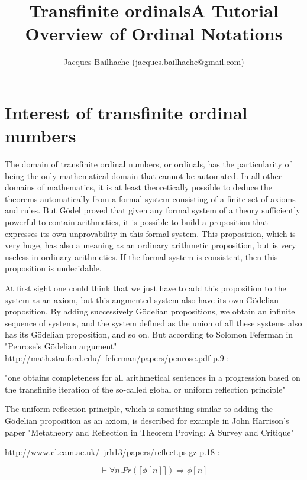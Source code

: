 \documentclass[10pt]{article}
\title{Transfinite ordinals}
\begin{document}
\title{A Tutorial Overview of Ordinal Notations}
\author{Jacques Bailhache (jacques.bailhache@gmail.com)}

\maketitle

\setlength{\parindent}{0pt}

\section{Interest of transfinite ordinal numbers}

The domain of transfinite ordinal numbers, or ordinals, has the particularity of being the only mathematical domain that cannot be automated. In all other domains of mathematics, it is at least theoretically possible to deduce the theorems automatically from a formal system consisting of a finite set of axioms and rules. But Gödel proved that given any formal system of a theory sufficiently powerful to contain arithmetics, it is possible to build a proposition that expresses its own unprovability in this formal system. This proposition, which is very huge, has also a meaning as an ordinary arithmetic proposition, but is very useless in ordinary arithmetics. If the formal system is consistent, then this proposition is undecidable. 

At first sight one could think that we just have to add this proposition to the system as an axiom, but this augmented system also have its own Gödelian proposition. By adding successively Gödelian propositions, we obtain an infinite sequence of systems, and the system defined as the union of all these systems also has its Gödelian proposition, and so on. 
But according to Solomon Feferman in "Penrose’s Gödelian argument" http://math.stanford.edu/~feferman/papers/penrose.pdf p.9 : 

"one obtains completeness for all arithmetical sentences in a progression based on the transfinite iteration of the so-called global or uniform reflection principle" 

The uniform reflection principle, which is something similar to adding the Gödelian proposition as an axiom, is described for example in John Harrison's paper "Metatheory and Reflection in Theorem Proving: A Survey and Critique" 

http://www.cl.cam.ac.uk/~jrh13/papers/reflect.ps.gz p.18 : 

\[ \vdash \forall n . Pr(\lceil \phi[n] \rceil) \Rightarrow \phi[n] \]
\end{document}
